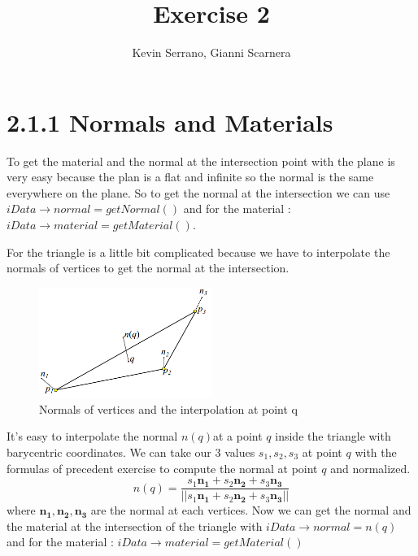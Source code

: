 \documentclass[10pt,a4paper]{report}
\author{Kevin Serrano, Gianni Scarnera}
\title{Exercise 2}
\begin{document}
\maketitle

\section*{2.1.1   Normals and Materials}
To get the material and the normal at the intersection point with the plane is very easy because the plan is a flat and infinite so the normal is the same everywhere on the plane. So to get the normal at the intersection we can use $iData\rightarrow normal = getNormal()$ and for the material : $iData\rightarrow material = getMaterial()$.


For the triangle is a little bit complicated because we have to interpolate the normals of vertices to get the normal at the intersection.
\begin{figure}[h!]
\caption{Normals of vertices and the interpolation at point q}
  \centering
    \includegraphics[width=0.5\textwidth]{triangleNormals.png}
\end{figure}

It's easy to interpolate the normal $n(q)$at a point $q$ inside the triangle with barycentric coordinates.
We can take our 3 values $s_1, s_2, s_3$ at point $q$ with the formulas of precedent exercise to compute the normal at point $q$ and normalized.
$$n(q) =  \frac{s_1 \mathbf{n_1} + s_2 \mathbf{n_2} + s_3 \mathbf{n_3}}{||s_1 \mathbf{n_1} + s_2 \mathbf{n_2} + s_3 \mathbf{n_3}|| }$$
where $\mathbf{n_1, n_2, n_3}$ are the normal at each vertices. Now we can get the normal and the material at the intersection of the triangle with $iData\rightarrow normal = n(q)$ and for the material : $iData\rightarrow material = getMaterial()$
\end{document}
